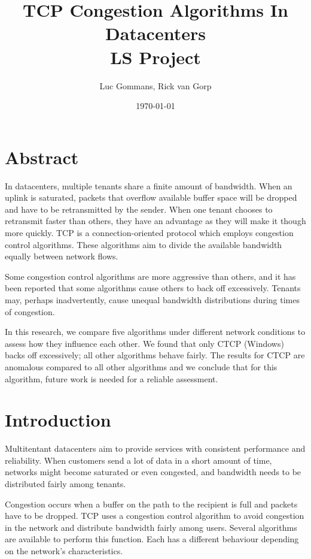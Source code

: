 \documentclass{article}
\title{TCP Congestion Algorithms In Datacenters \\
	\vspace{0.3cm}
	{\large LS Project}
}
\date{\today{}}
\author{Luc Gommans, Rick van Gorp}
\begin{document}
\maketitle

\section{Abstract}

In datacenters, multiple tenants share a finite amount of bandwidth. When an
uplink is saturated, packets that overflow available buffer space will be
dropped and have to be retransmitted by the sender. When one tenant chooses to
retransmit faster than others, they have an advantage as they will make it
though more quickly. TCP is a connection-oriented protocol which employs
congestion control algorithms. These algorithms aim to divide the available
bandwidth equally between network flows.

Some congestion control algorithms are more aggressive than others, and it has
been reported that some algorithms cause others to back off excessively.
Tenants may, perhaps inadvertently, cause unequal bandwidth distributions during
times of congestion.

In this research, we compare five algorithms under different network conditions
to assess how they influence each other. We found that only CTCP (Windows)
backs off excessively; all other algorithms behave fairly. The results for CTCP
are anomalous compared to all other algorithms and we conclude that for this
algorithm, future work is needed for a reliable assessment.


\section{Introduction}

Multitentant datacenters aim to provide services with consistent performance
and reliability. When customers send a lot of data in a short amount of time,
networks might become saturated or even congested, and bandwidth needs to be
distributed fairly among tenants.

Congestion occurs when a buffer on the path to the recipient is full and
packets have to be dropped. TCP uses a congestion control algorithm to avoid
congestion in the network and distribute bandwidth fairly among users. Several
algorithms are available to perform this function. Each has a different behaviour
depending on the network's characteristics.
\end{document}
